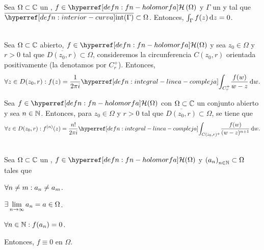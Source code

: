 \begin{teo}\label{teo:cauchy-goursat}
    Sea $\Omega \subset \mathbb{C}$ un , $f \in \exhyperref[defn:fn-holomorfa]{fn-holomorfa}{\mathcal{H}} \left(\Omega\right)$ y $\Gamma$ un   y  tal que $\bar{\exhyperref[defn:interior-curva]{interior-curva}{\operatorname{int}}(\Gamma)} \subset \Omega$. Entonces, $\int_{\Gamma} f(z) \odif{z} = 0$.
\end{teo}

\begin{teo}\label{teo:formula-integral-cauchy-disco}\mbox{}\\
    Sea $\Omega \subset \mathbb{C}$ abierto, $f \in \exhyperref[defn:fn-holomorfa]{fn-holomorfa}{\mathcal{H}}(\Omega)$ y sea $z_0 \in \Omega$ y $r > 0$ tal que $\overline{D(z_0, r)} \subset \Omega$, consideremos la circunferencia $C(z_0, r)$ orientada positivamente (la denotamos por $C_r^+$). Entonces,
    \[
    \forall z \in D(z_0, r) : f(z) = \frac{1}{2\pi i} \exhyperref[defn:integral-linea-compleja]{integral-linea-compleja}{\int_{C_r^+}} \frac{f(w)}{w - z} \odif{w}.
    \]
\end{teo}

\begin{teo}\label{teo:formula-integral-cauchy-derivadas}
    Sea $f \in \exhyperref[defn:fn-holomorfa]{fn-holomorfa}{\mathcal{H}}(\Omega)$ con $\Omega \subset \mathbb{C}$ un conjunto abierto y sea $n \in \mathbb{N}$. Entonces, para $z_0 \in \Omega$ y $r > 0$ tal que $\overline{D(z_0, r)} \subset \Omega$, se tiene que
    \[
    \forall z \in D(z_0, r) : 
    f^{(n)}(z) = \frac{n!}{2\pi i} \exhyperref[defn:integral-linea-compleja]{integral-linea-compleja}{\int_{C(z_0, r)^+}} \frac{f(w)}{(w-z)^{n+1}} \odif{w}.
    \]
\end{teo}

\begin{teo}\label{teo:ceros-aislados}\mbox{}\\
    Sea $\Omega \subset \mathbb{C}$ un , $f \in \exhyperref[defn:fn-holomorfa]{fn-holomorfa}{\mathcal{H}}(\Omega)$ y $\left(a_n\right)_{n\in\mathbb{N}} \subset \Omega$ tales que
    \begin{enu}[3][label=\textnormal{(\roman*)}]
        \item\label{teo:ceros-aislados-i} $\displaystyle \forall n \neq m : a_n \neq a_m$.
        \item\label{teo:ceros-aislados-ii} $\displaystyle \exists \lim_{n \to \infty} a_n = a \in \Omega$.
        \item\label{teo:ceros-aislados-iii} $\displaystyle \forall n \in \mathbb{N} : f(a_n) = 0$.
    \end{enu}
    Entonces, $f \equiv 0$ en $\Omega$.
\end{teo}
\vspace{0.3em}

